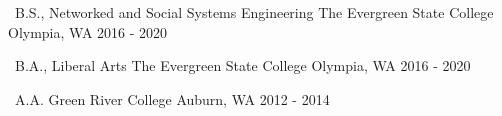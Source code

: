 




\begin{cvhonors}

  \cvhonor
	{~B.S., Networked and Social Systems Engineering} %
	{The Evergreen State College} %
	{Olympia, WA} %
	{2016 - 2020} %
   
  \cvhonor
	{~B.A., Liberal Arts} %
	{The Evergreen State College} %
	{Olympia, WA} %
	{2016 - 2020} %


  \cvhonor
    {~A.A.} %
    {Green River College} %
    {Auburn, WA} %
    {2012 - 2014} %

\end{cvhonors}

